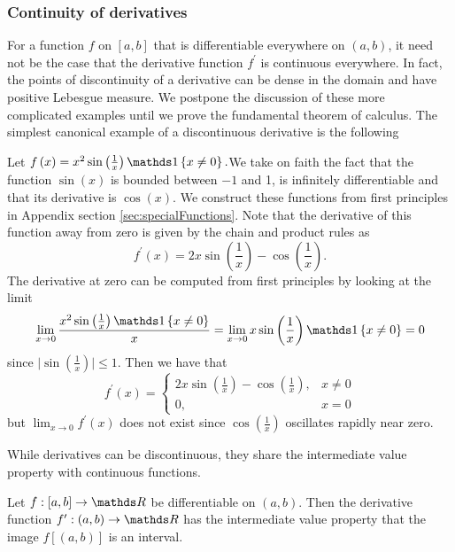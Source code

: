 \subsubsection{Continuity of derivatives}

For a function $f$ on $\left[a,b\right]$ that is differentiable
everywhere on $\left(a,b\right)$, it need not be the case that the
derivative function $f^{\prime}$ is continuous everywhere. In fact,
the points of discontinuity of a derivative can be dense in the domain
and have positive Lebesgue measure. We postpone the discussion of
these more complicated examples until we prove the fundamental theorem
of calculus. The simplest canonical example of a discontinuous derivative
is the following
\begin{example}
	\label{exa:discontinuousDerivative}Let $f\left(x\right)=x^{2}\sin\left(\frac{1}{x}\right)\indicate\left\{ x\neq0\right\} .$We
	take on faith the fact that the function $\sin\left(x\right)$ is
	bounded between $-1$ and 1, is infinitely differentiable and that
	its derivative is $\cos\left(x\right)$. We construct these functions
	from first principles in Appendix section \ref{sec:specialFunctions}.
	Note that the derivative of this function away from zero is given
	by the chain and product rules as 
	\[
	f^{\prime}\left(x\right)=2x\sin\left(\frac{1}{x}\right)-\cos\left(\frac{1}{x}\right).
	\]
	The derivative at zero can be computed from first principles by looking
	at the limit
	\[
	\lim_{x\to0}\frac{x^{2}\sin\left(\frac{1}{x}\right)\indicate\left\{ x\neq0\right\} }{x}=\lim_{x\to0}x\sin\left(\frac{1}{x}\right)\indicate\left\{ x\neq0\right\} =0
	\]
	since $\lvert\sin\left(\frac{1}{x}\right)\rvert\leq1$. Then we have
	that 
	\[
	f^{\prime}\left(x\right)=\begin{cases}
		2x\sin\left(\frac{1}{x}\right)-\cos\left(\frac{1}{x}\right), & x\neq0\\
		0, & x=0
	\end{cases}
	\]
	but $\lim_{x\to0}f^{\prime}\left(x\right)$ does not exist since $\cos\left(\frac{1}{x}\right)$
	oscillates rapidly near zero.
\end{example}

While derivatives can be discontinuous, they share the intermediate
value property with continuous functions.
\begin{prop}
	\label{prop:darbouxTheorem}Let $f:\left[a,b\right]\to\R$ be differentiable
	on $\left(a,b\right).$ Then the derivative function $f^{\prime}:\left(a,b\right)\to\R$
	has the intermediate value property that the image $f\left[\left(a,b\right)\right]$
	is an interval.
\end{prop}

